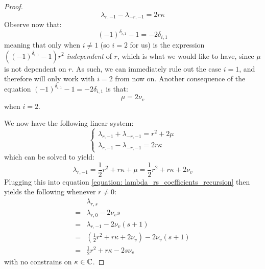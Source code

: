 \begin{proof}
                    $$\lambda_{r, -1} - \lambda_{-r, -1} = 2r\kappa$$
                Observe now that:
                    $$(-1)^{\delta_{i, 1}} - 1 = -2\delta_{i, 1}$$
                meaning that only when $i \not = 1$ (so $i = 2$ for us) is the expression $((-1)^{\delta_{i, 1}} - 1) r^2$ \textit{independent} of $r$, which is what we would like to have, since $\mu$ is not dependent on $r$. As such, we can immediately rule out the case $i = 1$, and therefore will only work with $i = 2$ from now on. Another consequence of the equation $(-1)^{\delta_{i, 1}} - 1 = -2\delta_{i, 1}$ is that:
                    $$\mu = 2\nu_v$$
                when $i = 2$.
                
                We now have the following linear system:
                    $$
                        \begin{cases}
                            \lambda_{r, -1} + \lambda_{-r, -1} = r^2 + 2\mu
                            \\
                            \lambda_{r, -1} - \lambda_{-r, -1} = 2r\kappa
                        \end{cases}
                    $$
                which can be solved to yield:
                    $$\lambda_{r, -1} = \frac12 r^2 + r\kappa + \mu = \frac12 r^2 + r\kappa + 2\nu_v$$
                Plugging this into equation \eqref{equation: lambda_rs_coefficients_recursion} then yields the following whenever $r \not = 0$:
                    $$
                        \begin{aligned}
                            & \lambda_{r, s}
                            \\
                            = & \lambda_{r, 0} - 2\nu_v s
                            \\
                            = & \lambda_{r, -1} - 2 \nu_v (s + 1)
                            \\
                            = & \left( \frac12 r^2 + r\kappa + 2\nu_v \right) - 2 \nu_v (s + 1)
                            \\
                            = & \frac12 r^2 + r\kappa - 2s \nu_v
                        \end{aligned} 
                    $$
                with no constrains on $\kappa \in \mathbb{C}$. 


\end{proof}
